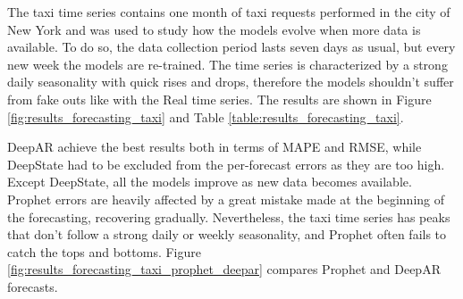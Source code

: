 \documentclass[a4paper, 12pt]{article} %
\begin{document}
	The taxi time series contains one month of taxi requests performed in the city of New York \cite{TaxiDataset} and was used to study how the models evolve when more data is available. To do so, the data collection period lasts seven days as usual, but every new week the models are re-trained. The time series is characterized by a strong daily seasonality with quick rises and drops, therefore the models shouldn't suffer from fake outs like with the Real time series. The results are shown in Figure \ref{fig:results_forecasting_taxi} and Table \ref{table:results_forecasting_taxi}. 
	
	DeepAR achieve the best results both in terms of MAPE and RMSE, while DeepState had to be excluded from the per-forecast errors as they are too high. Except DeepState, all the models improve as new data becomes available. Prophet errors are heavily affected by a great mistake made at the beginning of the forecasting, recovering gradually. Nevertheless, the taxi time series has peaks that don't follow a strong daily or weekly seasonality, and Prophet often fails to catch the tops and bottoms. Figure \ref{fig:results_forecasting_taxi_prophet_deepar} compares Prophet and DeepAR forecasts.
	
\end{document}
